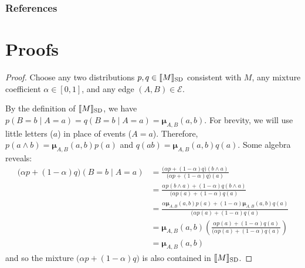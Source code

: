 \documentclass{article}
\newcommand\SD{_{\text{SD}}}
\newcommand{\bmu}{\boldsymbol{\mu}}
\newcommand{\Ed}{\mathcal E}
\numberwithin{equation}{section}
\begin{document}
	\subsubsection*{References}
	\printbibliography[heading=none]
	
	\onecolumn
	\appendix
	
	\section{Proofs}
	\thmsetconvex*
	\begin{proof}
		Choose any two distributions $p, q \in \bbr{M}\SD$ consistent with $M$, any mixture coefficient $\alpha \in [0,1]$, and any edge $(A,B) \in \Ed$.
		
		By the definition of $\bbr{M}\SD$, we have $p(B = b \mid A = a) = q(B = b \mid A = a) = \bmu_{A,B}(a,b)$.  
		For brevity, we will use little letters ($a$) in place of events ($A = a$).
		Therefore, $p(a\land b) = \bmu_{A,B}(a,b) p(a)$ and $q(ab) = \bmu_{A,B}(a,b) q(a)$. Some algebra reveals:
		\begin{align*}
			\Big( \alpha p + (1-\alpha) q \Big) (B = b \mid A = a) &= 
			\frac{\Big( \alpha p + (1-\alpha) q \Big) (b \land a)}{\Big( \alpha p + (1-\alpha) q \Big) (a)} \\
			&= \frac{ \alpha p(b \land a) + (1-\alpha) q(b \land a) }{\Big( \alpha p(a) + (1-\alpha) q (a)} \\
			&= \frac{ \alpha \bmu_{A,B}(a,b) p(a) + (1-\alpha) \bmu_{A,B}(a,b) q(a) }{\Big( \alpha p(a) + (1-\alpha) q (a)} \\
			&=\bmu_{A,B}(a,b) \left(\frac{ \alpha  p(a) + (1-\alpha) q(a) }{\Big( \alpha p(a) + (1-\alpha) q (a)}\right)\\
			&= \bmu_{A,B}(a,b)
		\end{align*}
		and so the mixture $\Big(\alpha p + (1-\alpha) q \Big)$ is also contained in $\bbr{M}\SD$.
	\end{proof}
	
\end{document}
